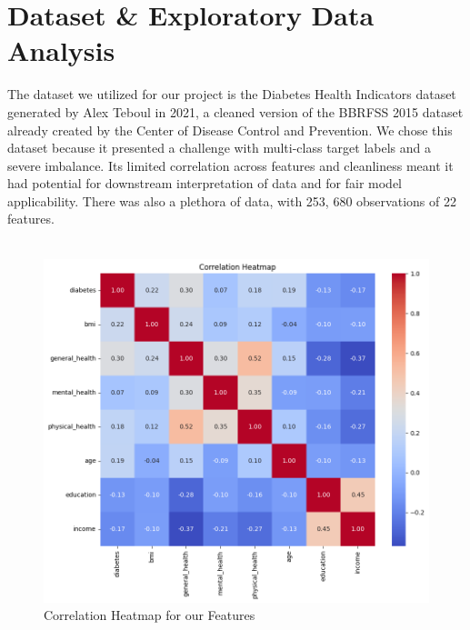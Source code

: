 \documentclass[conference]{IEEEtran}
\begin{document}
\section{Dataset \& Exploratory Data Analysis}\label{sec:eda}
The dataset we utilized for our project is the Diabetes Health Indicators dataset generated by Alex Teboul in 2021, a cleaned version of the BBRFSS 2015 dataset already created by the Center of Disease Control and Prevention. We chose this dataset because it presented a challenge with multi-class target labels and a severe imbalance. Its limited correlation across features and cleanliness meant it had potential for downstream interpretation of data and for fair model applicability. There was also a plethora of data, with 253, 680 observations of 22 features.\\\\
    
    \begin{figure}[h]
        \centering
        \includegraphics[scale=0.39]{correlations2.png}
        \caption{Correlation Heatmap for our Features}
        \label{fig:outliersBMI}
    \end{figure}
\end{document}
